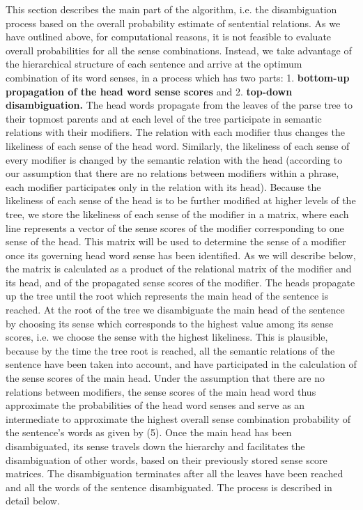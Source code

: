 This section describes the main part of the algorithm, i.e. the disambiguation process based on the overall probability estimate of sentential relations. As we have outlined above, for computational reasons, it is not feasible to evaluate overall probabilities for all the sense combinations. Instead, we take advantage of the hierarchical structure of each sentence and arrive at the optimum combination of its word senses, in a process which has two parts:  1. {\bf bottom-up propagation of the head word sense scores} and 2. {\bf top-down disambiguation.} The head words propagate from the leaves of the parse tree to their topmost parents and at each level of the tree participate in semantic relations with their modifiers. The relation with each modifier thus changes the likeliness of each sense of the head word. Similarly, the likeliness of each sense of every modifier is changed by the semantic relation with the head (according to our assumption that there are no relations between modifiers within a phrase, each modifier participates only in the relation with its head). Because the likeliness of each sense of the head is to be further modified at higher levels of the tree, we store the likeliness of each sense of the modifier in a matrix, where each line represents a vector of the sense scores of the modifier corresponding to one sense of the head. This matrix will be used to determine the sense of a modifier once its governing head word sense has been identified. As we will describe below, the matrix is calculated as a product of the relational matrix of the modifier and its head, and of the propagated sense scores of the modifier. The heads propagate up the tree until the root which represents the main head of the sentence is reached. At the root of the tree we disambiguate the main head of the sentence by choosing its sense which corresponds to the highest value among its sense scores, i.e. we choose the sense with the highest likeliness. This is plausible, because by the time the tree root is reached, all the semantic relations of the sentence have been taken into account, and have participated in the calculation of the sense scores of the main head. Under the assumption that there are no relations between modifiers, the sense scores of the main head word thus approximate the probabilities of the head word senses and serve as an intermediate to approximate the highest overall sense combination probability of the sentence's words as given by (5). Once the main head has been disambiguated, its sense travels down the hierarchy and facilitates the disambiguation of other words, based on their previously stored sense score matrices. The disambiguation terminates after all the leaves have been reached and all the words of the sentence disambiguated. The process is described in detail below.

